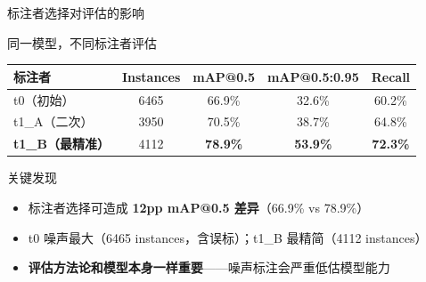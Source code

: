 \documentclass[aspectratio=169, 10pt]{beamer}
\begin{document}
\begin{frame}{标注者选择对评估的影响}
  \begin{block}{同一模型，不同标注者评估}
    \begin{tabular}{lcccc}
      \toprule
      标注者 & Instances & mAP@0.5 & mAP@0.5:0.95 & Recall \\
      \midrule
      t0（初始） & 6465 & 66.9\% & 32.6\% & 60.2\% \\
      t1\_A（二次） & 3950 & 70.5\% & 38.7\% & 64.8\% \\
      \textbf{t1\_B（最精准）} & 4112 & \textbf{78.9\%} & \textbf{53.9\%} & \textbf{72.3\%} \\
      \bottomrule
    \end{tabular}
  \end{block}
  \vspace{0em}
  \begin{alertblock}{关键发现}
    \begin{itemize}
      \item 标注者选择可造成 \textbf{12pp mAP@0.5 差异}（66.9\% vs 78.9\%）
      \item t0 噪声最大（6465 instances，含误标）；t1\_B 最精简（4112 instances）
      \item \textbf{评估方法论和模型本身一样重要}——噪声标注会严重低估模型能力
    \end{itemize}
  \end{alertblock}
\end{frame}
\end{document}
